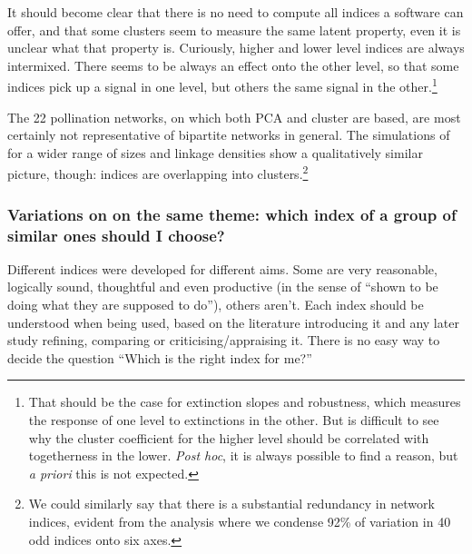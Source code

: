 \documentclass[a4paper, 11pt]{article}\usepackage[]{graphicx}\usepackage[dvipsnames]{xcolor}
\begin{document}
It should become clear that there is no need to compute all indices a software can offer, and that some clusters seem to measure the same latent property, even it is unclear what that property is. Curiously, higher and lower level indices are always intermixed. There seems to be always an effect onto the other level, so that some indices pick up a signal in one level, but others the same signal in the other.\footnote{That should be the case for extinction slopes and robustness, which measures the response of one level to extinctions in the other. But is difficult to see why the cluster coefficient for the higher level should be correlated with togetherness in the lower. \emph{Post hoc}, it is always possible to find a reason, but \emph{a priori} this is not expected.}

The 22 pollination networks, on which both PCA and cluster are based, are most certainly not representative of bipartite networks in general. The simulations of \citet{Dormann2009} for a wider range of sizes and linkage densities show a qualitatively similar picture, though: indices are overlapping into clusters.\footnote{We could similarly say that there is a substantial redundancy in network indices, evident from the analysis where we condense 92\% of variation in 40 odd indices onto six axes.}



\subsubsection{Variations on on the same theme: which index of a group of similar ones should I choose?}


Different indices were developed for different aims. Some are very reasonable, logically sound, thoughtful and even productive (in the sense of ``shown to be doing what they are supposed to do''), others aren't. Each index should be understood when being used, based on the literature introducing it and any later study refining, comparing or criticising/appraising it. There is no easy way to decide the question ``Which is the right index for me?''
\end{document}
